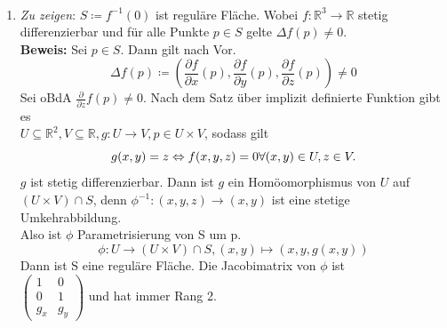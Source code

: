 \begin{solution}
  \
  \begin{enumerate}[label= (\alph*)] 
    \item \emph{Zu zeigen}: \( S \coloneqq f^{-1}(0) \) ist reguläre Fläche. Wobei \( f: \mathbb{R}^3 \to \mathbb{R} \) stetig differenzierbar und für alle Punkte \( p \in S \) gelte \( \Delta f(p) \neq 0 \). \\
    \textbf{Beweis:} Sei \( p \in S \). Dann gilt nach Vor.
    \begin{equation*}
     \Delta f(p) \coloneqq \left(\frac{\partial f}{\partial x}(p), 
      \frac{\partial f}{\partial y}(p), 
      \frac{\partial f}{\partial z}(p) \right) \neq 0
    \end{equation*}
    Sei oBdA \( \frac{\partial}{\partial z} f(p) \neq 0 \). Nach dem Satz über implizit definierte Funktion gibt es\\
    \( U \subseteq \mathbb{R}^2, V \subseteq \mathbb{R}, g: U \to V, p \in U \times V \), sodass gilt\\
    \begin{equation*}
      g(x,y) = z \Leftrightarrow f(x,y,z) = 0 \hfill \forall (x,y) \in U, z \in V. \\
    \end{equation*}
    \( g \) ist stetig differenzierbar. Dann ist \( g \) ein Homöomorphismus von \( U \) auf \( (U \times V) \cap S \), denn \( \phi^{-1}:(x,y,z) \to (x,y) \) ist eine stetige Umkehrabbildung. \\
    Also ist \( \phi \) Parametrisierung von S um p.
    \begin{equation*}
      \phi: U \to (U \times V) \cap S, (x,y) \mapsto (x,y,g(x,y))
    \end{equation*}
    Dann ist S eine reguläre Fläche.
    Die Jacobimatrix von \( \phi \) ist\\ 
    \( \begin{pmatrix}
      1 & 0 \\
      0 & 1 \\
      g_x & g_y
    \end{pmatrix} \) und hat immer Rang 2.
    

\end{enumerate}
\end{solution}
